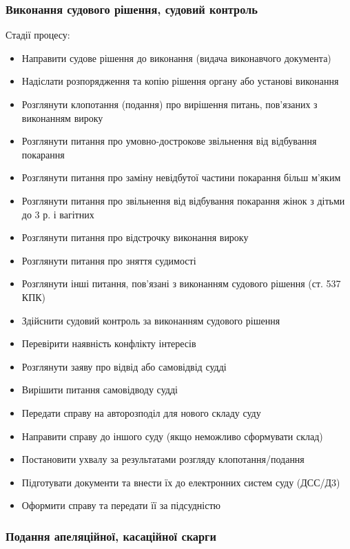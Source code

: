 \documentclass{article}
\begin{document}
\newpage
\subsubsection{Виконання судового рішення, судовий контроль}

Стадії процесу:

\begin{itemize}
    \item Направити судове рішення до виконання (видача виконавчого документа)
    \item Надіслати розпорядження та копію рішення органу або установі виконання
    \item Розглянути клопотання (подання) про вирішення питань, пов’язаних з виконанням вироку
    \item Розглянути питання про умовно-дострокове звільнення від відбування покарання
    \item Розглянути питання про заміну невідбутої частини покарання більш м’яким
    \item Розглянути питання про звільнення від відбування покарання жінок з дітьми до 3 р. і вагітних
    \item Розглянути питання про відстрочку виконання вироку
    \item Розглянути питання про зняття судимості
    \item Розглянути інші питання, пов’язані з виконанням судового рішення (ст. 537 КПК)
    \item Здійснити судовий контроль за виконанням судового рішення
    \item Перевірити наявність конфлікту інтересів
    \item Розглянути заяву про відвід або самовідвід судді
    \item Вирішити питання самовідводу судді
    \item Передати справу на авторозподіл для нового складу суду
    \item Направити справу до іншого суду (якщо неможливо сформувати склад)
    \item Постановити ухвалу за результатами розгляду клопотання/подання
    \item Підготувати документи та внести їх до електронних систем суду (ДСС/Д3)
    \item Оформити справу та передати її за підсудністю
\end{itemize}


\newpage
\subsubsection{Подання апеляційної, касаційної скарги}
\end{document}
